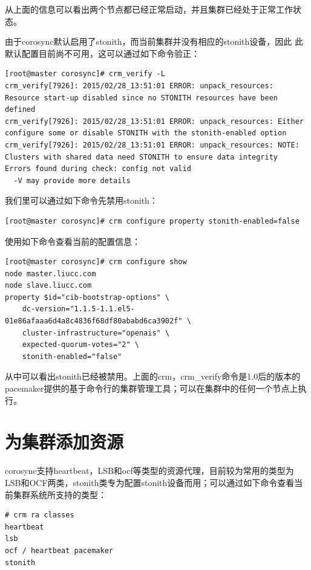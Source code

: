 从上面的信息可以看出两个节点都已经正常启动，并且集群已经处于正常工作状
态。

由于corosync默认启用了stonith，而当前集群并没有相应的stonith设备，因此
此默认配置目前尚不可用，这可以通过如下命令验正：

\begin{verbatim}
[root@master corosync]# crm_verify -L
crm_verify[7926]: 2015/02/28_13:51:01 ERROR: unpack_resources: Resource start-up disabled since no STONITH resources have been defined
crm_verify[7926]: 2015/02/28_13:51:01 ERROR: unpack_resources: Either configure some or disable STONITH with the stonith-enabled option
crm_verify[7926]: 2015/02/28_13:51:01 ERROR: unpack_resources: NOTE: Clusters with shared data need STONITH to ensure data integrity
Errors found during check: config not valid
  -V may provide more details

\end{verbatim}

我们里可以通过如下命令先禁用stonith：

\begin{verbatim}
[root@master corosync]# crm configure property stonith-enabled=false
\end{verbatim}

使用如下命令查看当前的配置信息：

\begin{verbatim}
[root@master corosync]# crm configure show
node master.liucc.com
node slave.liucc.com
property $id="cib-bootstrap-options" \
	dc-version="1.1.5-1.1.el5-01e86afaaa6d4a8c4836f68df80ababd6ca3902f" \
	cluster-infrastructure="openais" \
	expected-quorum-votes="2" \
	stonith-enabled="false"
\end{verbatim}

从中可以看出stonith已经被禁用。上面的crm，crm\_verify命令是1.0后的版本的
pacemaker提供的基于命令行的集群管理工具；可以在集群中的任何一个节点上执
行。

\section{为集群添加资源}

corosync支持heartbeat，LSB和ocf等类型的资源代理，目前较为常用的类型为
LSB和OCF两类，stonith类专为配置stonith设备而用；可以通过如下命令查看当
前集群系统所支持的类型：

\begin{verbatim}
# crm ra classes 
heartbeat
lsb
ocf / heartbeat pacemaker
stonith
\end{verbatim}

